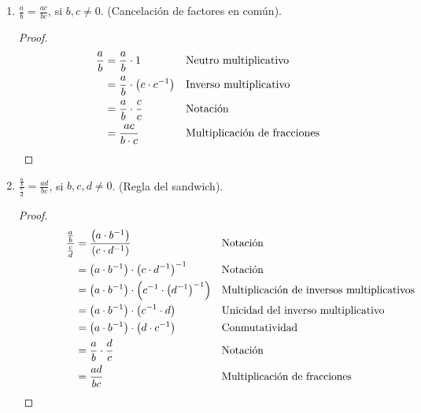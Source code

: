 \documentclass[11pt]{article}
\begin{document}
\begin{enumerate}[label=\alph*)]
 \item $\frac{a}{b} = \frac{ac}{bc}$, si $b,c \neq 0$. (Cancelación de factores en común).
 \begin{proof} 
 \begin{align*}
 \frac{a}{b}&=\frac{a}{b}\cdot 1 && \text{Neutro multiplicativo}\\
 &= \frac{a}{b}\cdot \bigl(c \cdot c^{-1}\bigr) && \text{Inverso multiplicativo}\\
 &= \frac{a}{b} \cdot \frac{c}{c} && \text{Notación}\\
 &= \frac{ac}{b\cdot c} && \text{Multiplicación de fracciones} \qedhere
 \end{align*}
 \end{proof}
 
 \item $\frac{\frac{a}{b}}{\frac{c}{d}} = \frac{ad}{bc}$, si $b, c, d \neq 0$. (Regla del sandwich).
 \begin{proof} 
 \begin{align*} \qquad \ \qquad
 \frac{\frac{a}{b}}{\frac{c}{d}} &= \frac{\left( a \cdot b^{-1} \right)}{\left( c \cdot d^{-1} \right)} && \text{Notación}\\
 &= \left( a \cdot b^{-1} \right) \cdot \left( c \cdot d^{-1} \right)^{-1} && \text{Notación}\\
 &= \left( a \cdot b^{-1} \right) \cdot \left( c^{-1} \cdot \left( d^{-1} \right) ^{-1} \right) && \text{Multiplicación de inversos multiplicativos}\\
 &= \left( a \cdot b^{-1} \right) \cdot \left( c^{-1} \cdot d \right) && \text{Unicidad del inverso multiplicativo}\\
 &= \left( a \cdot b^{-1} \right) \cdot \left( d \cdot c^{-1} \right) && \text{Conmutatividad}\\
 &= \frac{a}{b} \cdot \frac{d}{c} && \text{Notación}\\
 &= \frac{ad}{bc} && \text{Multiplicación de fracciones} \qedhere
 \end{align*}  
 \end{proof}


\end{enumerate}
\end{document}
